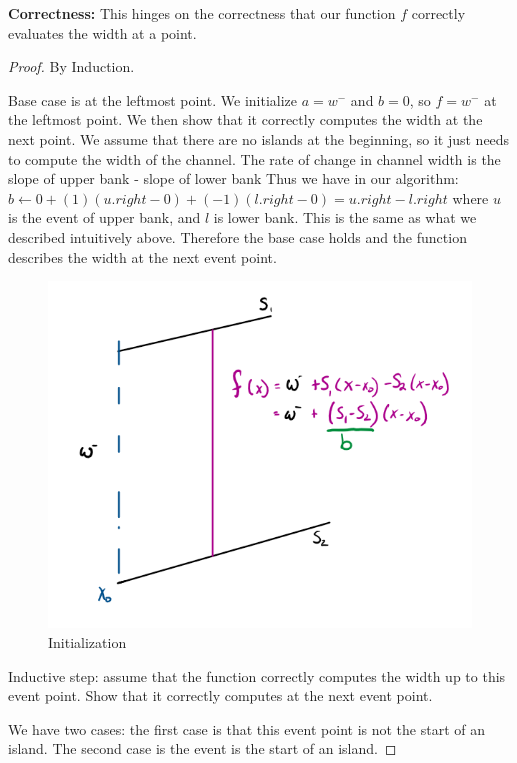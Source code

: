 \documentclass[11pt]{article}
\begin{document}
\textbf{Correctness:} 
This hinges on the correctness that our function $f$ correctly evaluates the width at a point.
\newpage
\begin{proof}
    By Induction.

    Base case is at the leftmost point. We initialize $a = w^-$ and $b = 0$, so $f = w^-$
    at the leftmost point. We then show that it correctly computes the width at the next point.
    We assume that there are no islands at the beginning, so it just needs to compute the width
    of the channel. The rate of change in channel width is the slope of upper bank - slope of lower bank
    Thus we have in our algorithm: $b \gets 0 + (1) (u.right - 0) + (-1)(l.right - 0) = u.right - l.right$
    where $u$ is the event of upper bank, and $l$ is lower bank. This is the same as what we described
    intuitively above. Therefore the base case holds and the function describes the width at the next event point.

    \begin{figure}[h]
        \centering
        \includegraphics[width = .5\textwidth]{init_width.png}
        \caption{Initialization}
    \end{figure}

    Inductive step: assume that the function correctly computes the width up to this event point.
    Show that it correctly computes at the next event point.

    We have two cases: the first case is that this event point is not the start of an island. The second case is the event is the start of an island.
    

\end{proof}
\end{document}
